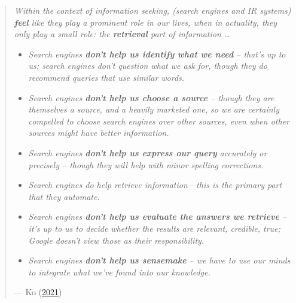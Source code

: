\documentclass[letterpaper, nobind]{templates/ociamthesis}
\begin{document}
\begin{quote}
\emph{Within the context of information seeking, (search engines and IR systems) \textbf{feel} like they play a prominent role in our lives, when in actuality, they only play a small role: the \textbf{retrieval} part of information \ldots{}}

\begin{itemize}
\item
  \emph{Search engines \textbf{don't help us identify what we need} -- that's up to us; search engines don't question what we ask for, though they do recommend queries that use similar words.}
\item
  \emph{Search engines \textbf{don't help us choose a source} -- though they are themselves a source, and a heavily marketed one, so we are certainly compelled to choose search engines over other sources, even when other sources might have better information.}
\item
  \emph{Search engines \textbf{don't help us express our query} accurately or precisely -- though they will help with minor spelling corrections.}
\item
  \emph{Search engines do help retrieve information---this is the primary part that they automate.}
\item
  \emph{Search engines \textbf{don't help us evaluate the answers we retrieve} -- it's up to us to decide whether the results are relevant, credible, true; Google doesn't view those as their responsibility.}
\item
  \emph{Search engines \textbf{don't help us sensemake} -- we have to use our minds to integrate what we've found into our knowledge.}
\end{itemize}

\hfill --- Ko (\protect\hyperlink{ref-ko2021seeking}{2021})
\end{quote}
\end{document}
